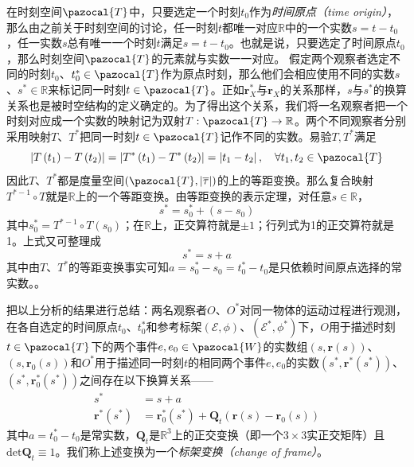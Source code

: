 \documentclass[main.tex]{subfiles}
\begin{document}
在时刻空间$\pazocal{T}$中，只要选定一个时刻$t_0$作为\emph{时间原点（time origin）}，那么由之前关于时刻空间的讨论，任一时刻$t$都唯一对应$\mathbb{R}$中的一个实数$s=t-t_0$，任一实数$s$总有唯一一个时刻$t$满足$s=t-t_0$。也就是说，只要选定了时间原点$t_0$，那么时刻空间$\pazocal{T}$的元素就与实数一一对应。
假定两个观察者选定不同的时刻$t_0$、$t_0^*\in\pazocal{T}$作为原点时刻，那么他们会相应使用不同的实数$s$、$s^*\in\mathbb{R}$来标记同一时刻$t\in\pazocal{T}$。正如$\mathbf{r}^*_X$与$\mathbf{r}_X$的关系那样，$s$与$s^*$的换算关系也是被时空结构的定义确定的。为了得出这个关系，我们将一名观察者把一个时刻对应成一个实数的映射记为双射$T:\pazocal{T}\rightarrow\mathbb{R}$。两个不同观察者分别采用映射$T$、$T^*$把同一时刻$t\in\pazocal{T}$记作不同的实数。易验$T,T^*$满足
\[\left|T\left(t_1\right)-T\left(t_2\right)\right|=\left|T^*\left(t_1\right)-T^*\left(t_2\right)\right|=\left|t_1-t_2\right|,\quad\forall t_1,t_2\in\pazocal{T}\]
因此$T$、$T^*$都是度量空间$\left(\pazocal{T},\left|\overline{\tau}\right|\right)$的上的等距变换。那么复合映射$T^{*-1}\circ T$就是$\mathbb{R}$上的一个等距变换。由等距变换的表示定理，对任意$s\in\mathbb{R}$，
\[s^*=s_0^*+\left(s-s_0\right)\]
其中$s_0^*=T^{*-1}\circ T\left(s_0\right)$；在$\mathbb{R}$上，正交算符就是$\pm 1$；行列式为1的正交算符就是1。上式又可整理成
\[s^*=s+a\]
其中由$T$、$T^*$的等距变换事实可知$a=s_0^*-s_0=t_0^*-t_0$是只依赖时间原点选择的常实数。。

把以上分析的结果进行总结：两名观察者$O$、$O^*$对同一物体的运动过程进行观测，在各自选定的时间原点$t_0$、$t_0^*$和参考标架$\left(\mathcal{E},\phi\right)$、$\left(\mathcal{E}^*,\phi^*\right)$下，$O$用于描述时刻$t\in\pazocal{T}$下的两个事件$e,e_0\in\pazocal{W}$的实数组$\left(s,\mathbf{r}\left(s\right)\right)$、$\left(s,\mathbf{r}_0\left(s\right)\right)$和$O^*$用于描述同一时刻$t$的相同两个事件$e,e_0$的实数$\left(s^*,\mathbf{r}^*\left(s^*\right)\right)$、$\left(s^*,\mathbf{r}^*_0\left(s^*\right)\right)$之间存在以下换算关系——
\begin{align*}
    s^*                          & =s+a                                                                                                         \\
    \mathbf{r}^*\left(s^*\right) & =\mathbf{r}_0^*\left(s^*\right)+\mathbf{Q}_t\left(\mathbf{r}\left(s\right)-\mathbf{r}_0\left(s\right)\right)
\end{align*}
其中$a=t_0^*-t_0$是常实数，$\mathbf{Q}_t$是$\mathbb{R}^3$上的正交变换（即一个$3\times 3$实正交矩阵）且$\mathrm{det}\mathbf{Q}_t\equiv 1$。我们称上述变换为一个\emph{标架变换（change of frame）}。
\end{document}
